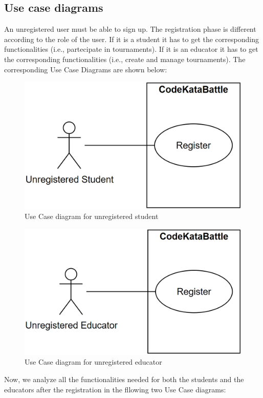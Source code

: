 \documentclass[12pt, a4paper]{report}
\begin{document}
        \subsection{Use case diagrams}
        An unregistered user must be able to sign up. 
        The registration phase is different according to the role of the user. 
        If it is a student it has to get the corresponding functionalities (i.e., partecipate in tournaments). 
        If it is an educator it has to get the corresponding functionalities (i.e., create and manage tournaments). 
        The corresponding Use Case Diagrams are shown below: 
        \begin{figure}[H]
            \centering
            \includegraphics[width=0.5\linewidth]{images/unregisteredstud.png}
            \caption{Use Case diagram for unregistered student}
        \end{figure}
        \begin{figure}[H]
            \centering
            \includegraphics[width=0.5\linewidth]{images/unregistereded.png}
            \caption{Use Case diagram for unregistered educator}
        \end{figure}
        Now, we analyze all the functionalities needed for both the students and the educators after the registration in the fllowing two Use Case diagrams: 
\end{document}
